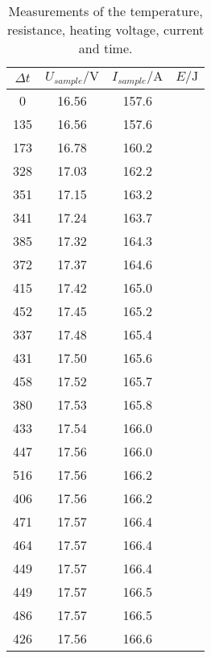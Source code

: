 \begin{table}[htbp] 
    \centering 
    \begin{tabular}{ccc | c} 
        \toprule $\Delta t$ & $U_{sample}/\unit{\volt}$ & $I_{sample}/\unit{\ampere}$ & $E/\unit{\joule}$\\ 
        \midrule 
        0   & 16.56 & 157.6 &  \\   
        135 & 16.56 & 157.6 &  \\
        173 & 16.78 & 160.2 &  \\
        328 & 17.03 & 162.2 &  \\
        351 & 17.15 & 163.2 &  \\
        341 & 17.24 & 163.7 &  \\
        385 & 17.32 & 164.3 &  \\
        372 & 17.37 & 164.6 &  \\
        415 & 17.42 & 165.0 &  \\
        452 & 17.45 & 165.2 &  \\
        337 & 17.48 & 165.4 &  \\
        431 & 17.50 & 165.6 &  \\
        458 & 17.52 & 165.7 &  \\
        380 & 17.53 & 165.8 &  \\
        433 & 17.54 & 166.0 &  \\
        447 & 17.56 & 166.0 &  \\
        516 & 17.56 & 166.2 &  \\
        406 & 17.56 & 166.2 &  \\
        471 & 17.57 & 166.4 &  \\
        464 & 17.57 & 166.4 &  \\
        449 & 17.57 & 166.4 &  \\
        449 & 17.57 & 166.5 &  \\
        486 & 17.57 & 166.5 &  \\
        426 & 17.56 & 166.6 &  \\
        \bottomrule 
    \end{tabular} 
    \caption[Tabelle]{Measurements of the temperature, resistance, heating voltage, current and time.} 
    \label{tab:measurement} 
\end{table}